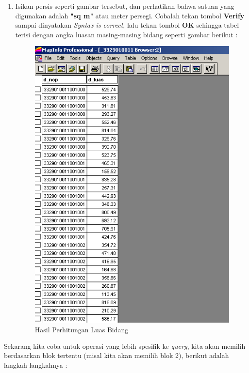\begin{enumerate}[1.]
  \item Isikan persis seperti gambar tersebut, dan perhatikan bahwa satuan yang digunakan adalah \textbf{"sq m"} atau meter persegi. Cobalah tekan tombol \textbf{Verify} sampai dinyatakan \textit{Syntax is correct}, lalu tekan tombol \textbf{OK} sehingga tabel terisi dengan angka luasan masing-masing bidang seperti gambar berikut :
  
  \begin{figure}[H]
    \centering
    \includegraphics[width=1\textwidth]{./resources/069-hasil-update-column}
    \caption{Hasil Perhitungan Luas Bidang}
  \end{figure}
\end{enumerate}

Sekarang kita coba untuk operasi yang lebih spesifik ke \textit{query}, kita akan memilih berdasarkan blok tertentu (misal kita akan memilih blok 2), berikut adalah langkah-langkahnya :

